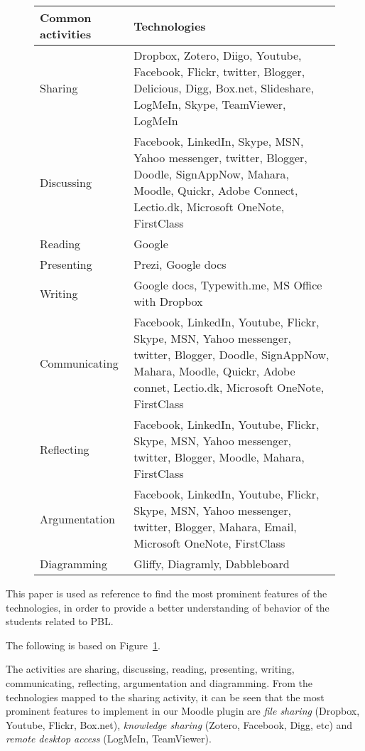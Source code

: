 \begin{figure}		
\begin{tabular}{|p{3cm}|p{}|}
\hline
Common activities & Technologies \\ \hline
Sharing & Dropbox, Zotero, Diigo, Youtube, Facebook, Flickr, twitter, Blogger, Delicious, Digg, Box.net, Slideshare, LogMeIn, Skype, 
TeamViewer, LogMeIn  \\ \hline
Discussing & Facebook, LinkedIn, Skype, MSN, Yahoo messenger, twitter, Blogger, Doodle, SignAppNow, Mahara, Moodle, Quickr, Adobe Connect, Lectio.dk, Microsoft OneNote, FirstClass \\ \hline
Reading & Google \\ \hline
Presenting & Prezi, Google docs \\ \hline
Writing & Google docs, Typewith.me, MS Office with Dropbox \\ \hline
Communicating & Facebook, LinkedIn, Youtube, Flickr, Skype, MSN, Yahoo messenger, twitter, Blogger, Doodle, SignAppNow, Mahara, Moodle, Quickr, Adobe connet, Lectio.dk, Microsoft OneNote, FirstClass \\ \hline
Reflecting & Facebook, LinkedIn, Youtube, Flickr, Skype, MSN, Yahoo messenger, twitter, Blogger, Moodle, Mahara, FirstClass \\ \hline
Argumentation & Facebook, LinkedIn, Youtube, Flickr, Skype, MSN, Yahoo messenger, twitter, Blogger, Mahara, Email, Microsoft OneNote, FirstClass \\ \hline
Diagramming & Gliffy, Diagramly, Dabbleboard \\ \hline

\end{tabular}
\label{tab:figure3}
\end{figure}


This paper is used as reference to find the most prominent features of the technologies, in order to provide a better understanding of behavior of the students related to PBL.

The following is based on Figure~\ref{tab:figure3}.

The activities are sharing, discussing, reading, presenting, writing, communicating, reflecting, argumentation and diagramming.
From the technologies mapped to the sharing activity, it can be seen that the most prominent features to implement in our Moodle plugin are \textit{file sharing} (Dropbox, Youtube, Flickr, Box.net), \textit{knowledge sharing} (Zotero, Facebook, Digg, etc) and \textit{remote desktop access} (LogMeIn, TeamViewer).

